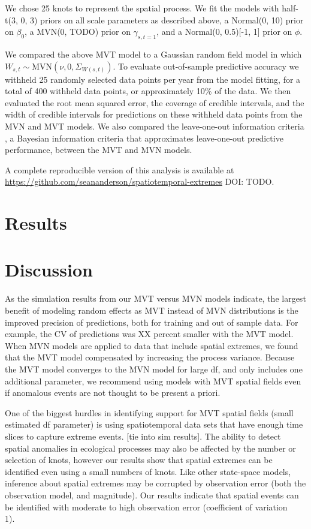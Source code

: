 \documentclass[12pt,english]{article}
\begin{document}
\begin{spacing}{1.5}
We chose 25 knots to represent the spatial process.
We fit the models with half-t(3, 0, 3) priors on all
scale parameters as described above,
a Normal(0, 10) prior on $\beta_0$,
a MVN(0, TODO) prior on $\gamma_{s,t=1}$,
and a Normal(0, 0.5)[-1, 1] prior on $\phi$.

We compared the above MVT
model to a Gaussian random field model in which
$W_{s,t} \sim \mathrm{MVN}\left(\nu, 0, \Sigma_{W(s,t)}\right)$.
To evaluate out-of-sample predictive accuracy we withheld
25 randomly selected data points
per year from the model fitting,
for a total of 400 withheld data points,
or approximately 10\% of the data.
We then evaluated the root mean squared error,
the coverage of credible intervals, and the width of credible intervals
for predictions on these withheld data points
from the MVN and MVT models.
We also compared the leave-one-out information criteria
\citep[LOOIC;][]{vehtari2016}, a Bayesian information criteria that approximates
leave-one-out predictive performance,
between the MVT and MVN models.

A complete reproducible version of this analysis is available at
\url{https://github.com/seananderson/spatiotemporal-extremes} DOI: TODO.

\section{Results}

\section{Discussion}

As the simulation results from our MVT versus MVN models indicate, the largest
benefit of modeling random effects as MVT instead of MVN distributions is the
improved precision of predictions, both for training and out of sample data.
For example, the CV of predictions was XX percent smaller with the MVT model.
When MVN models are applied to data that include spatial extremes, we found that
the MVT model compensated by increasing the process variance. Because the MVT model
converges to the MVN model for large df, and only includes one additional parameter,
we recommend using models with MVT spatial fields even if anomalous events are not
thought to be present a priori.

One of the biggest hurdles in identifying support for MVT spatial fields (small estimated
df parameter) is using spatiotemporal data sets that have enough time slices to capture
extreme events. [tie into sim results]. The ability to detect spatial anomalies in ecological 
processes may also be affected by the number or selection of knots, however our results
show that spatial extremes can be identified even using a small numbers of knots. Like other
state-space models, inference about spatial extremes may be corrupted by observation 
error (both the observation model, and magnitude). Our results indicate that spatial events
can be identified with moderate to high observation error (coefficient of variation ~ 1). 


\end{spacing}
\end{document}
